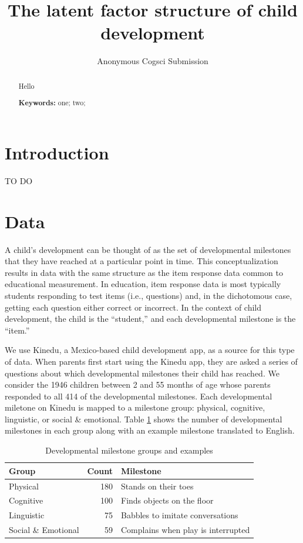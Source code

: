 \documentclass[10pt, letterpaper]{article}
\title{The latent factor structure of child development}
\author{Anonymous Cogsci Submission}
\newenvironment{CodeChunk}{}{}
\begin{document}
\maketitle

\begin{abstract}
Hello

\textbf{Keywords:}
one; two;
\end{abstract}

\hypertarget{introduction}{%
\section{Introduction}\label{introduction}}

TO DO

\hypertarget{data}{%
\section{Data}\label{data}}

A child's development can be thought of as the set of developmental
milestones that they have reached at a particular point in time. This
conceptualization results in data with the same structure as the item
response data common to educational measurement. In education, item
response data is most typically students responding to test items (i.e.,
questions) and, in the dichotomous case, getting each question either
correct or incorrect. In the context of child development, the child is
the ``student,'' and each developmental milestone is the ``item.''

We use Kinedu, a Mexico-based child development app, as a source for
this type of data. When parents first start using the Kinedu app, they
are asked a series of questions about which developmental milestones
their child has reached. We consider the 1946 children between 2 and 55
months of age whose parents responded to all 414 of the developmental
milestones. Each developmental miletone on Kinedu is mapped to a
milestone group: physical, cognitive, linguistic, or social \&
emotional. Table \ref{tab:examples} shows the number of developmental
milestones in each group along with an example milestone translated to
English.

\begin{CodeChunk}
\begin{table}[!h]

\caption{\label{tab:examples}Developmental milestone groups and examples}
\centering
\fontsize{8}{10}\selectfont
\begin{tabular}[t]{l|r|l}
\hline
Group & Count & Milestone\\
\hline
Physical & 180 & Stands on their toes\\
\hline
Cognitive & 100 & Finds objects on the floor\\
\hline
Linguistic & 75 & Babbles to imitate conversations\\
\hline
Social \& Emotional & 59 & Complains when play is interrupted\\
\hline
\end{tabular}
\end{table}

\end{CodeChunk}
\end{document}
